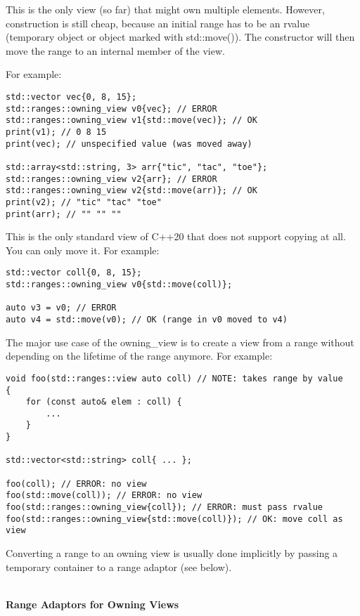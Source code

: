 This is the only view (so far) that might own multiple elements. However, construction is still cheap, because an initial range has to be an rvalue (temporary object or object marked with std::move()). The constructor will then move the range to an internal member of the view.

For example:

\begin{lstlisting}[style=styleCXX]
std::vector vec{0, 8, 15};
std::ranges::owning_view v0{vec}; // ERROR
std::ranges::owning_view v1{std::move(vec)}; // OK
print(v1); // 0 8 15
print(vec); // unspecified value (was moved away)

std::array<std::string, 3> arr{"tic", "tac", "toe"};
std::ranges::owning_view v2{arr}; // ERROR
std::ranges::owning_view v2{std::move(arr)}; // OK
print(v2); // "tic" "tac" "toe"
print(arr); // "" "" ""
\end{lstlisting}

This is the only standard view of C++20 that does not support copying at all. You can only move it. For example:

\begin{lstlisting}[style=styleCXX]
std::vector coll{0, 8, 15};
std::ranges::owning_view v0{std::move(coll)};

auto v3 = v0; // ERROR
auto v4 = std::move(v0); // OK (range in v0 moved to v4)
\end{lstlisting}

The major use case of the owning\_view is to create a view from a range without depending on the lifetime of the range anymore. For example:

\begin{lstlisting}[style=styleCXX]
void foo(std::ranges::view auto coll) // NOTE: takes range by value
{
	for (const auto& elem : coll) {
		...
	}
}

std::vector<std::string> coll{ ... };

foo(coll); // ERROR: no view
foo(std::move(coll)); // ERROR: no view
foo(std::ranges::owning_view{coll}); // ERROR: must pass rvalue
foo(std::ranges::owning_view{std::move(coll)}); // OK: move coll as view
\end{lstlisting}

Converting a range to an owning view is usually done implicitly by passing a temporary container to a range adaptor (see below).

\noindent
\hspace*{\fill} \\ %
\textbf{Range Adaptors for Owning Views}

